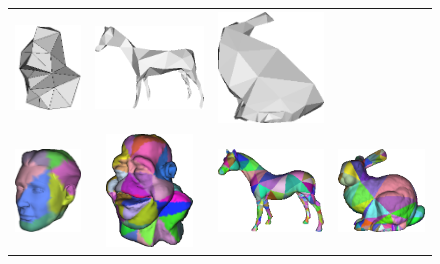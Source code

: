 \begin{figure}
\begin{center}
\begin{tabular}{cccc}
\includegraphics[height=3cm]{../images/dinohead_control} &
\includegraphics[height=3cm]{../images/horse_control} &
\includegraphics[height=3cm]{../images/bunny_control} \\
\includegraphics[height=3cm]{../images/cubehead_mapsmooth} &
\includegraphics[height=3cm]{../images/dinohead_mapsmooth} &
\includegraphics[height=3cm]{../images/horse_mapsmooth} &
\includegraphics[height=3cm]{../images/bunny_mapsmooth} \\

\end{tabular}
\end{center}
\end{figure}
